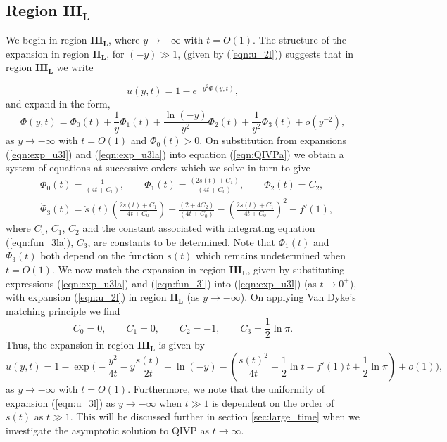 \documentclass[11pt,a4paper]{article}
\newcommand{\eeref}[1]{(\ref{eqn:#1})}
\newcommand{\eelab}[1]{\label{eqn:#1}}
\newcommand{\ssref}[1]{\ref{sec:#1}}
\newcommand{\sslab}[1]{\label{sec:#1}}
\def\beq{\begin{equation}}
\def\eeq{\end{equation}}
\begin{document}
\subsection{Region  $\mathbf{III_L}$} \sslab{large_spatiala}
We begin in region $\mathbf{III_L}$, where $y \to - \infty$ with $t=O(1)$. The structure of the expansion in region $\mathbf{II_L}$, for $(-y)\gg 1$, (given by \eeref{u_2l}) suggests that in region $\mathbf{III_L}$ we write

\beq \eelab{exp_u3l}
u(y,t) = 1 - e^{-y^2 \Phi(y,t)} ,
\eeq
and expand in the form, 
\beq \eelab{exp_u3la}
\Phi(y,t) = \Phi_0(t) + \frac{1}{y} \Phi_1(t) + \frac{ \ln (- y )}{y^2} \Phi_2(t) + \frac{1}{y^2} \Phi_3(t) + o\left(y^{-2} \right),
\eeq
as $y \to - \infty$ with $t=O(1)$  and $\Phi_0(t) > 0$. On substitution from  expansions \eeref{exp_u3l} and \eeref{exp_u3la} into equation \eeref{QIVPa} we obtain a system of equations at successive orders which we solve in turn to give 
\begin{subequations}  \eelab{fun_3l}
 \begin{align}
& \Phi_0(t)=\frac{1}{(4t+C_0)}, \qquad \Phi_1(t)=\frac{(2s(t) + C_1)}{(4t + C_0)}, \qquad \Phi_2(t) = C_2,  \\
& \dot \Phi_3(t) = \dot{s}(t) \left( \frac{2s(t) + C_1}{4t + C_0} \right) + \frac{(2 + 4 C_2)}{(4t + C_0)} - \left( \frac{2s(t) + C_1}{4t + C_0} \right)^2 -f'(1), \eelab{fun_3la}
\end{align} 
\end{subequations}
where $C_0$, $C_1$,  $C_2$ and the constant associated with integrating equation \eeref{fun_3la}, $C_3$, are   constants to be determined. 
%
Note that $\Phi_1(t)$ and $\Phi_3(t)$ both depend on the function $s(t)$ which remains undetermined  when $t=O(1)$. We now match the expansion in region $\mathbf{III_L}$, given by substituting expressions \eeref{exp_u3la}  and \eeref{fun_3l}  into \eeref{exp_u3l} (as $t \to 0^+$), with expansion \eeref{u_2l} in region $\mathbf{II_L}$ (as $y \to -\infty$). On applying Van Dyke's matching principle \cite{VanDyke1975} we find
\beq
C_0=0, \qquad C_1=0, \qquad C_2 = -1, \qquad C_3 =\frac{1}{2} \ln \pi .
\eeq 
Thus, the expansion in region $\mathbf{III_L}$ is given by 
\beq
u(y,t) = 1  - \exp \Bigg( -\frac{y^2}{4t}  - y \frac{ s(t)}{2t}   - \ln (- y )   - \left( \frac{s(t)^2}{4t}  - \frac{1}{2} \ln t - f'(1) t + \frac{1}{2} \ln \pi  \right) +o(1) \Bigg),  \eelab{u_3l}
\eeq
as $y \to - \infty$ with $t=O(1)$. Furthermore, we note that the uniformity of expansion \eeref{u_3l}  as $y \to - \infty$ when $t \gg 1$ is dependent on the order of $s(t)$ as $t \gg 1$. This will be discussed further in section \ssref{large_time} when we investigate the asymptotic solution to QIVP as $t \to \infty$.
\end{document}
